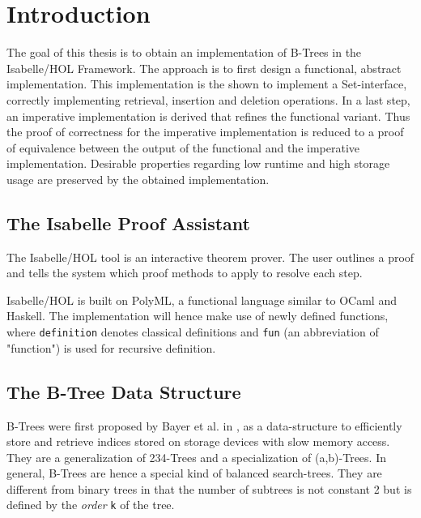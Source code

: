 
\chapter{Introduction}\label{chapter:introduction}

The goal of this thesis is to obtain an implementation of B-Trees in the Isabelle/HOL Framework.
The approach is to first design a functional, abstract implementation.
This implementation is the shown to implement a Set-interface,
correctly implementing retrieval, insertion and deletion operations.
In a last step, an imperative implementation is derived that
refines the functional variant.
Thus the proof of correctness for the imperative implementation
is reduced to a proof of equivalence between the output of the
functional and the imperative implementation.
Desirable properties regarding low runtime and high storage usage
are preserved by the obtained implementation.

\section{The Isabelle Proof Assistant}

The Isabelle/HOL tool is an interactive theorem prover.
The user outlines a proof and tells the system which proof methods to apply to
resolve each step.

Isabelle/HOL is built on PolyML, a functional language similar to OCaml
and Haskell.%
The implementation will hence make use of newly defined functions, where
\texttt{definition} denotes classical definitions and \texttt{fun} (an abbreviation of "function")
is used for recursive definition.


\section{The B-Tree Data Structure}

B-Trees were first proposed by Bayer et al. in \parencite{DBLP:journals/acta/BayerM72},
as a data-structure to efficiently store and retrieve indices stored on storage devices
with slow memory access.
They are a generalization of 234-Trees and a specialization of (a,b)-Trees. %
In general, B-Trees are hence a special kind of balanced search-trees.
They are different from binary trees in that the number of subtrees is not constant 2
but is defined by the \textit{order} \texttt{k} of the tree.

